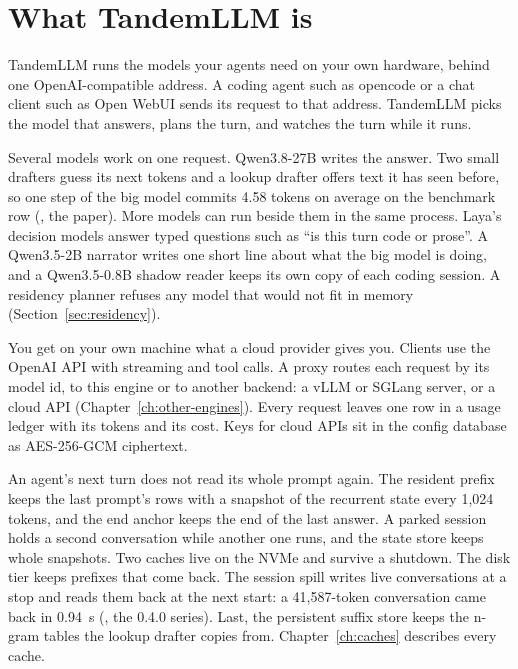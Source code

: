 \chapter{What TandemLLM is}\label{ch:intro}

TandemLLM runs the models your agents need on your own hardware, behind one OpenAI-compatible address. A coding agent such as opencode or a chat client such as Open WebUI sends its request to that address. TandemLLM picks the model that answers, plans the turn, and watches the turn while it runs.

Several models work on one request. Qwen3.8-27B writes the answer. Two small drafters guess its next tokens and a lookup drafter offers text it has seen before, so one step of the big model commits 4.58 tokens on average on the benchmark row (\measured, the paper). More models can run beside them in the same process. Laya's decision models answer typed questions such as \enquote{is this turn code or prose}. A Qwen3.5-2B narrator writes one short line about what the big model is doing, and a Qwen3.5-0.8B shadow reader keeps its own copy of each coding session. A residency planner refuses any model that would not fit in memory (Section~\ref{sec:residency}).

You get on your own machine what a cloud provider gives you. Clients use the OpenAI API with streaming and tool calls. A proxy routes each request by its model id, to this engine or to another backend: a vLLM or SGLang server, or a cloud API (Chapter~\ref{ch:other-engines}). Every request leaves one row in a usage ledger with its tokens and its cost. Keys for cloud APIs sit in the config database as AES-256-GCM ciphertext.

An agent's next turn does not read its whole prompt again. The resident prefix keeps the last prompt's rows with a snapshot of the recurrent state every 1,024 tokens, and the end anchor keeps the end of the last answer. A parked session holds a second conversation while another one runs, and the state store keeps whole snapshots. Two caches live on the NVMe and survive a shutdown. The disk tier keeps prefixes that come back. The session spill writes live conversations at a stop and reads them back at the next start: a 41,587-token conversation came back in 0.94~s (\measured, the 0.4.0 series). Last, the persistent suffix store keeps the n-gram tables the lookup drafter copies from. Chapter~\ref{ch:caches} describes every cache.

